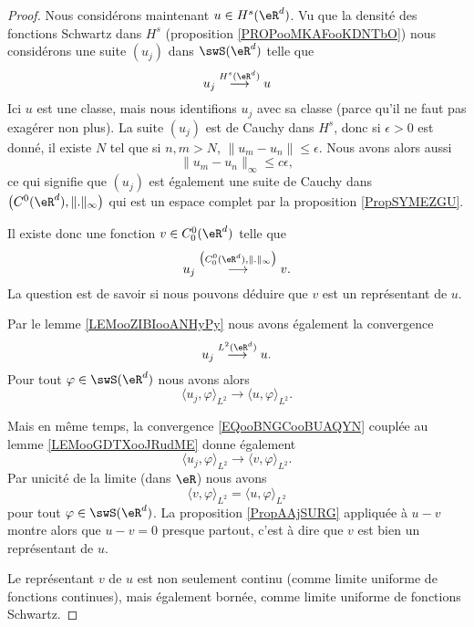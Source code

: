 \begin{proof}
    Nous considérons maintenant \( u\in H^s(\eR^d)\). Vu que la densité des fonctions Schwartz dans \( H^s\) (proposition \ref{PROPooMKAFooKDNTbO}) nous considérons une suite \( (u_j)\) dans \( \swS(\eR^d)\) telle que
    \begin{equation}
        u_j\stackrel{H^s(\eR^d)}{\longrightarrow}u
    \end{equation}
    Ici \( u\) est une classe, mais nous identifions \( u_j\) avec sa classe (parce qu'il ne faut pas exagérer non plus). La suite \( (u_j)\) est de Cauchy dans \( H^s\), donc si \( \epsilon>0\) est donné, il existe \( N\) tel que si \( n,m>N\), \( \| u_m-u_n \|\leq \epsilon\). Nous avons alors aussi
    \begin{equation}
        \| u_m-u_n \|_{\infty}\leq c\epsilon,
    \end{equation}
    ce qui signifie que \( (u_j)\) est également une suite de Cauchy dans \( \big( C^0(\eR^d),\| . \|_{\infty} \big)\) qui est un espace complet par la proposition \ref{PropSYMEZGU}.

    Il existe donc une fonction \( v\in C_0^0(\eR^d)\) telle que
    \begin{equation}        \label{EQooBNGCooBUAQYN}
        u_j\stackrel{\big( C^0_0(\eR^d), \| . \|_{\infty} \big)}{\longrightarrow}v.
    \end{equation}
    La question est de savoir si nous pouvons déduire que \( v\) est un représentant de \( u\). 

    Par le lemme \ref{LEMooZIBIooANHyPy} nous avons également la convergence
    \begin{equation}
        u_j\stackrel{L^2(\eR^d)}{\longrightarrow} u.
    \end{equation}
    Pour tout \( \varphi\in \swS(\eR^d)\) nous avons alors
    \begin{equation}
        \langle u_j, \varphi\rangle_{L^2}\to\langle u, \varphi\rangle_{L^2}.
    \end{equation}
    
    Mais en même temps, la convergence \eqref{EQooBNGCooBUAQYN} couplée au lemme \ref{LEMooGDTXooJRudME} donne également 
    \begin{equation}
        \langle u_j, \varphi\rangle_{L^2}\to \langle v, \varphi\rangle_{L^2}.
    \end{equation}
    Par unicité de la limite (dans \( \eR\)) nous avons 
    \begin{equation}
        \langle v, \varphi\rangle_{L^2}=\langle u, \varphi\rangle_{L^2}
    \end{equation}
    pour tout \( \varphi\in\swS(\eR^d)\). La proposition \ref{PropAAjSURG} appliquée à \( u-v\) montre alors que \( u-v=0\) presque partout, c'est à dire que \( v\) est bien un représentant de \( u\).

    Le représentant \( v\) de \( u\) est non seulement continu (comme limite uniforme de fonctions continues), mais également bornée, comme limite uniforme de fonctions Schwartz.
\end{proof}

